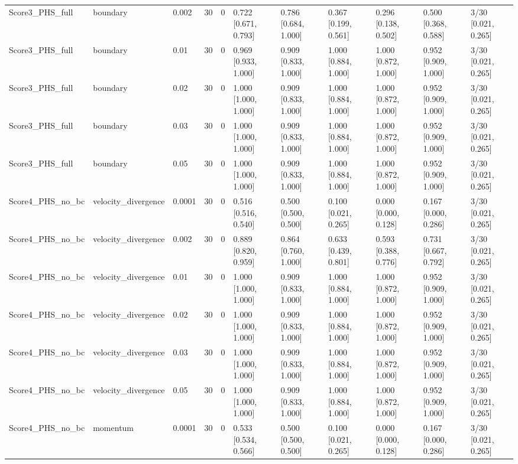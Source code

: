 \begin{longtable}{lllllllllll}
Score3\_PHS\_full & boundary & 0.002 & 30 & 0 & 0.722 [0.671, 0.793] & 0.786 [0.684, 1.000] & 0.367 [0.199, 0.561] & 0.296 [0.138, 0.502] & 0.500 [0.368, 0.588] & 3/30 [0.021, 0.265] \\
Score3\_PHS\_full & boundary & 0.01 & 30 & 0 & 0.969 [0.933, 1.000] & 0.909 [0.833, 1.000] & 1.000 [0.884, 1.000] & 1.000 [0.872, 1.000] & 0.952 [0.909, 1.000] & 3/30 [0.021, 0.265] \\
Score3\_PHS\_full & boundary & 0.02 & 30 & 0 & 1.000 [1.000, 1.000] & 0.909 [0.833, 1.000] & 1.000 [0.884, 1.000] & 1.000 [0.872, 1.000] & 0.952 [0.909, 1.000] & 3/30 [0.021, 0.265] \\
Score3\_PHS\_full & boundary & 0.03 & 30 & 0 & 1.000 [1.000, 1.000] & 0.909 [0.833, 1.000] & 1.000 [0.884, 1.000] & 1.000 [0.872, 1.000] & 0.952 [0.909, 1.000] & 3/30 [0.021, 0.265] \\
Score3\_PHS\_full & boundary & 0.05 & 30 & 0 & 1.000 [1.000, 1.000] & 0.909 [0.833, 1.000] & 1.000 [0.884, 1.000] & 1.000 [0.872, 1.000] & 0.952 [0.909, 1.000] & 3/30 [0.021, 0.265] \\
Score4\_PHS\_no\_bc & velocity\_divergence & 0.0001 & 30 & 0 & 0.516 [0.516, 0.540] & 0.500 [0.500, 0.500] & 0.100 [0.021, 0.265] & 0.000 [0.000, 0.128] & 0.167 [0.000, 0.286] & 3/30 [0.021, 0.265] \\
Score4\_PHS\_no\_bc & velocity\_divergence & 0.002 & 30 & 0 & 0.889 [0.820, 0.959] & 0.864 [0.760, 1.000] & 0.633 [0.439, 0.801] & 0.593 [0.388, 0.776] & 0.731 [0.667, 0.792] & 3/30 [0.021, 0.265] \\
Score4\_PHS\_no\_bc & velocity\_divergence & 0.01 & 30 & 0 & 1.000 [1.000, 1.000] & 0.909 [0.833, 1.000] & 1.000 [0.884, 1.000] & 1.000 [0.872, 1.000] & 0.952 [0.909, 1.000] & 3/30 [0.021, 0.265] \\
Score4\_PHS\_no\_bc & velocity\_divergence & 0.02 & 30 & 0 & 1.000 [1.000, 1.000] & 0.909 [0.833, 1.000] & 1.000 [0.884, 1.000] & 1.000 [0.872, 1.000] & 0.952 [0.909, 1.000] & 3/30 [0.021, 0.265] \\
Score4\_PHS\_no\_bc & velocity\_divergence & 0.03 & 30 & 0 & 1.000 [1.000, 1.000] & 0.909 [0.833, 1.000] & 1.000 [0.884, 1.000] & 1.000 [0.872, 1.000] & 0.952 [0.909, 1.000] & 3/30 [0.021, 0.265] \\
Score4\_PHS\_no\_bc & velocity\_divergence & 0.05 & 30 & 0 & 1.000 [1.000, 1.000] & 0.909 [0.833, 1.000] & 1.000 [0.884, 1.000] & 1.000 [0.872, 1.000] & 0.952 [0.909, 1.000] & 3/30 [0.021, 0.265] \\
Score4\_PHS\_no\_bc & momentum & 0.0001 & 30 & 0 & 0.533 [0.534, 0.566] & 0.500 [0.500, 0.500] & 0.100 [0.021, 0.265] & 0.000 [0.000, 0.128] & 0.167 [0.000, 0.286] & 3/30 [0.021, 0.265] \\

\end{longtable}
